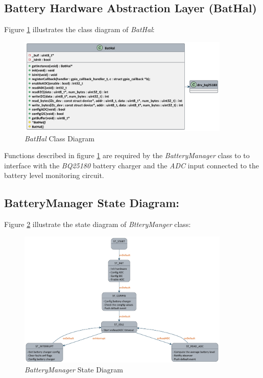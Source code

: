 \documentclass[report.tex]{subfiles}
\begin{document}
\pagebreak
\subsection{Battery Hardware Abstraction Layer (BatHal)}

Figure \ref{fig:bathal} illustrates the class diagram of \textit{BatHal}: 

\begin{figure}[H]
	\centering
	\includegraphics[width=0.9\textwidth]{Include/Figure/software/class/bathal.pdf}
\caption{\textit{BatHal} Class Diagram}
	\label{fig:bathal}
\end{figure}

Functions described in figure \ref{fig:bathal} are required by the \textit{BatteryManager} class to  to interface with the \textit{BQ25180} battery charger and the \textit{ADC} input connected to the battery level monitoring circuit.

\subsection{BatteryManager State Diagram:}

Figure \ref{fig:batteryManagerstate} illustrate the state diagram of \textit{BtteryManger} class:

\begin{figure}[H]
	\centering
	\includegraphics[width=0.9\textwidth]{Include/Figure/software/state/batteryManager.pdf}
	\caption{\textit{BatteryManager} State Diagram}
	\label{fig:batteryManagerstate}
\end{figure}
\end{document}
